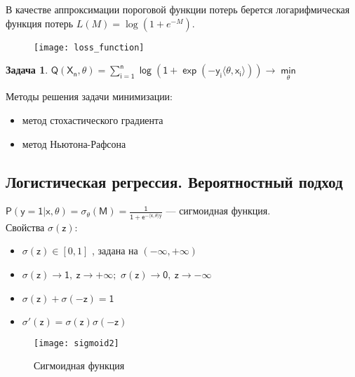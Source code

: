\documentclass{article}
\newtheorem{task}{Задача}
\begin{document}
В качестве аппроксимации пороговой функции потерь берется логарифмическая функция потерь $L(M)=\log(1+e^{-M}).$

\begin{figure}[hhh!]
	\begin{center}
		\texttt{[image: loss\_function]}
	\end{center}
	\vspace{-5mm}
\end{figure}

\newpage

\begin{task}
	$\mathsf{Q(X_n, \theta)=\sum \limits_{i=1}^n \log (1+\exp{(-y_i\langle \theta,x_i\rangle)}) \to \min \limits_{\theta}}$
\end{task}
Методы решения задачи минимизации:
\begin{itemize}
	\item метод стохастического градиента
	\item метод Ньютона-Рафсона
\end{itemize}


\subsection{Логистическая регрессия. Вероятностный подход}
$\mathsf{P(y = 1|x,\theta)=\sigma_\theta(M)=\frac{1}{1+e^{-\langle x,\theta \rangle y}}}$ --- сигмоидная функция. \\
Свойства $\mathsf{\sigma(z)}$:

\begin{itemize}
	\item $\mathsf{\sigma(z)} \in [0,1]$ , задана на $(-\infty,+\infty)$
	\item {$\mathsf{\sigma(z)\to 1,~ z\to +\infty};$ $\mathsf{\sigma(z)\to 0,~ z\to -\infty} $}
	\item $\mathsf{\sigma(z)+\sigma(-z)=1}$
	\item $\mathsf{\sigma ' (z)=\sigma (z)\sigma(-z)}$
\end{itemize}

\begin{figure}[h!]
	\begin{center}
		\texttt{[image: sigmoid2]}
	\end{center}
	\caption{Сигмоидная функция}
	\vspace{-5mm}
\end{figure}

\newpage
\end{document}

